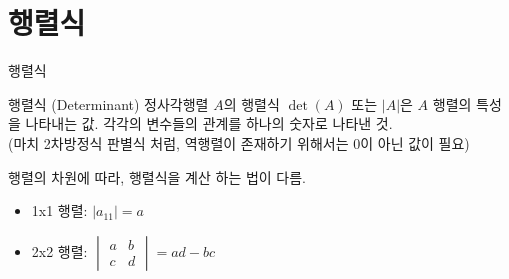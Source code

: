\documentclass[aspectratio=169]{beamer}
\begin{document}
\section{행렬식}
\begin{frame}{행렬식}
  \begin{block}{행렬식 (Determinant)}
    정사각행렬 \( A \)의 행렬식 \( \det(A) \) 또는 \( |A| \)은 $A$ 행렬의 특성을 나타내는 값. 각각의 변수들의 관계를 하나의 숫자로 나타낸 것. \\
    (마치 2차방정식 판별식 처럼, 역행렬이 존재하기 위해서는 0이 아닌 값이 필요)
  \end{block}
  \vspace{10pt}
  행렬의 차원에 따라, 행렬식을 계산 하는 법이 다름.
  \begin{itemize}
    \item 1x1 행렬: \( |a_{11}| = a \)
    \item 2x2 행렬: \( \begin{vmatrix} a & b \\ c & d \end{vmatrix} = ad-bc \)
  \end{itemize}
\end{frame}
\end{document}
